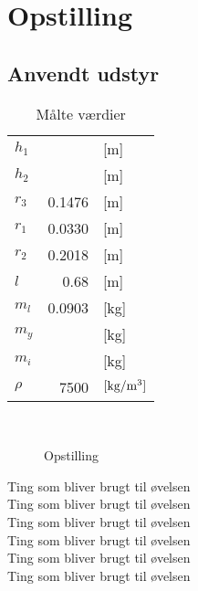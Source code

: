 \section{Opstilling}
\subsection*{Anvendt udstyr}
                                
\begin{wraptable}[2]{R}[2cm]{0.66\textwidth}
\vspace{-1.5\baselineskip}
  \begin{tabular}{lrl}
  \textbf{$h_{1}$}      &        & [m]  \\ 
  \textbf{$h_{2}$}      &        & [m]  \\   
  \textbf{$r_{3}$}      & 0.1476 & [m]  \\   
  \textbf{$r_{1}$}      & 0.0330 & [m]  \\  
  \textbf{$r_{2}$}      & 0.2018 & [m]  \\    
  \textbf{$l$}          & 0.68   & [m]  \\  
  \textbf{$m_{l}$}      & 0.0903 & [kg] \\
  \textbf{$m_{y}$}      &        & [kg] \\ 
  \textbf{$m_{i}$}      &        & [kg] \\
  \textbf{$\rho$}       & 7500   & $\left[\text{kg/m\textsuperscript{3}}\right]$  \\ 
  
  \end{tabular}
  \caption{Målte værdier}\label{tab:maal}
\end{wraptable}~
\begin{wrapfigure}[33]{R}[2cm]{0.66\textwidth}
\vspace{-6.5\baselineskip}
\par
{}
\par
{}
\caption{Opstilling}
\end{wrapfigure}
Ting som bliver brugt til øvelsen  \\
Ting som bliver brugt til øvelsen  \\
Ting som bliver brugt til øvelsen  \\
Ting som bliver brugt til øvelsen  \\
Ting som bliver brugt til øvelsen  \\
Ting som bliver brugt til øvelsen  \\

